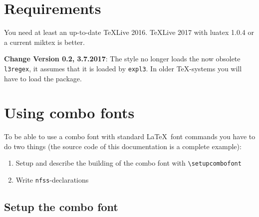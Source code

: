 \documentclass[parskip=half-,egregdoesnotlikesansseriftitles]{scrartcl}
\begin{document}
\section{Requirements}
You need at least an up-to-date TeXLive 2016. TeXLive 2017 with luatex 1.0.4 or a current miktex is better.

\textbf{Change Version 0.2, 3.7.2017}: The style no longer loads the now obsolete \texttt{l3regex}, it assumes that it is loaded by \texttt{expl3}. In older \TeX-systems you will have to load the package.


\section{Using combo fonts}

To be able to use a combo font with standard \LaTeX\ font commands you have to do two things (the source code of this documentation is a complete example):

\begin{enumerate}
\item Setup and describe the building of the combo font with \verb+\setupcombofont+

\item Write \texttt{nfss}-declarations
\end{enumerate}

\subsection{Setup the combo font}

\DescribeMacro{}
\end{document}
